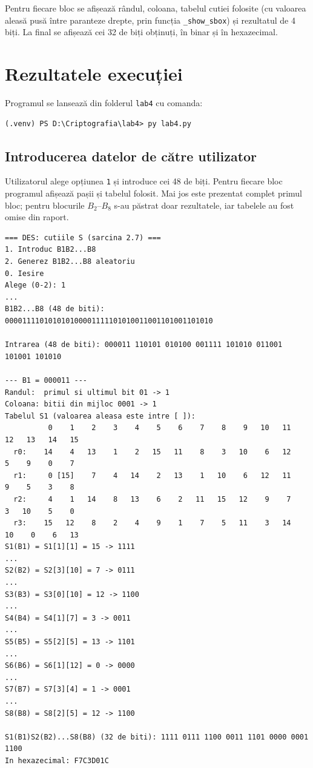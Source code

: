 \documentclass[12pt,a4paper]{article}
\begin{document}
Pentru fiecare bloc se afișează rândul, coloana, tabelul cutiei folosite (cu
valoarea aleasă pusă între paranteze drepte, prin funcția \texttt{\_show\_sbox}) și
rezultatul de 4 biți. La final se afișează cei 32 de biți obținuți, în binar și în
hexazecimal.

\section{Rezultatele execuției}

Programul se lansează din folderul \texttt{lab4} cu comanda:
\begin{lstlisting}[style=terminal]
(.venv) PS D:\Criptografia\lab4> py lab4.py
\end{lstlisting}

\subsection{Introducerea datelor de către utilizator}

Utilizatorul alege opțiunea \texttt{1} și introduce cei 48 de biți. Pentru
fiecare bloc programul afișează pașii și tabelul folosit. Mai jos este prezentat
complet primul bloc; pentru blocurile $B_2$--$B_8$ s-au păstrat doar rezultatele,
iar tabelele au fost omise din raport.

\begin{lstlisting}[style=terminal, basicstyle=\ttfamily\scriptsize, caption={Aplicarea cutiilor S pentru datele introduse de utilizator}]
=== DES: cutiile S (sarcina 2.7) ===
1. Introduc B1B2...B8
2. Generez B1B2...B8 aleatoriu
0. Iesire
Alege (0-2): 1
...
B1B2...B8 (48 de biti): 000011110101010100001111101010011001101001101010

Intrarea (48 de biti): 000011 110101 010100 001111 101010 011001 101001 101010

--- B1 = 000011 ---
Randul:  primul si ultimul bit 01 -> 1
Coloana: bitii din mijloc 0001 -> 1
Tabelul S1 (valoarea aleasa este intre [ ]):
          0    1    2    3    4    5    6    7    8    9   10   11   12   13   14   15
  r0:    14    4   13    1    2   15   11    8    3   10    6   12    5    9    0    7
  r1:     0 [15]    7    4   14    2   13    1   10    6   12   11    9    5    3    8
  r2:     4    1   14    8   13    6    2   11   15   12    9    7    3   10    5    0
  r3:    15   12    8    2    4    9    1    7    5   11    3   14   10    0    6   13
S1(B1) = S1[1][1] = 15 -> 1111
...
S2(B2) = S2[3][10] = 7 -> 0111
...
S3(B3) = S3[0][10] = 12 -> 1100
...
S4(B4) = S4[1][7] = 3 -> 0011
...
S5(B5) = S5[2][5] = 13 -> 1101
...
S6(B6) = S6[1][12] = 0 -> 0000
...
S7(B7) = S7[3][4] = 1 -> 0001
...
S8(B8) = S8[2][5] = 12 -> 1100

S1(B1)S2(B2)...S8(B8) (32 de biti): 1111 0111 1100 0011 1101 0000 0001 1100
In hexazecimal: F7C3D01C
\end{lstlisting}
\end{document}
